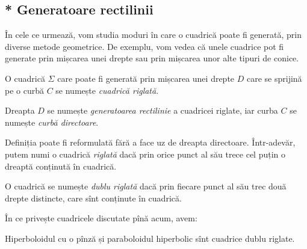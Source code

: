 
\subsection{* Generatoare rectilinii}

\indent\indent În cele ce urmează, vom studia moduri în care o cuadrică poate fi
generată, prin diverse metode geometrice. De exemplu, vom vedea că unele cuadrice
pot fi generate prin mișcarea unei drepte sau prin mișcarea unor alte tipuri
de conice.

\begin{definition}
	O cuadrică $\Sigma$ care poate fi generată prin mișcarea unei drepte $D$
care se sprijină pe o curbă $C$ se numește \emph{cuadrică riglată}.

Dreapta $D$ se numește \emph{generatoarea rectilinie} a cuadricei riglate,
iar curba $C$ se numește \emph{curbă directoare}.

\end{definition}

Definiția poate fi reformulată fără a face uz de dreapta directoare. Într-adevăr,
putem numi o cuadrică \emph{riglată} dacă prin orice punct al său trece cel puțin
o dreaptă conținută în cuadrică.

O cuadrică se numește \emph{dublu riglată} dacă prin fiecare punct al său trec
două drepte distincte, care sînt conținute în cuadrică.


În ce privește cuadricele discutate pînă acum, avem:
\begin{theorem}
	Hiperboloidul cu o pînză și paraboloidul hiperbolic sînt cuadrice 
dublu riglate.
\end{theorem}


